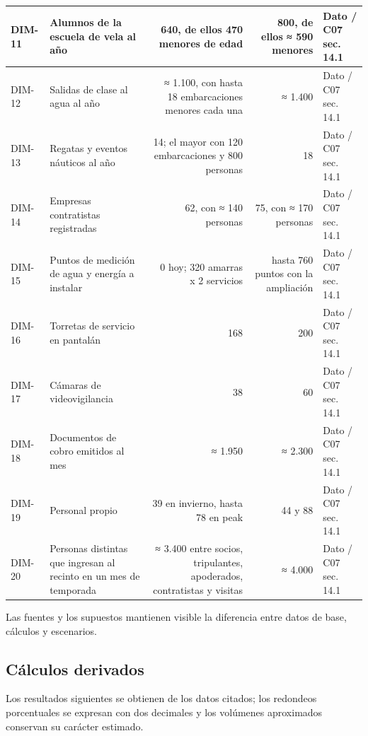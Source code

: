 \begin{longtable}{|L{0.075697\AnchoTablaAnexo}|L{0.254980\AnchoTablaAnexo}|R{0.294821\AnchoTablaAnexo}|R{0.266932\AnchoTablaAnexo}|L{0.107570\AnchoTablaAnexo}|}
DIM-11 & Alumnos de la escuela de vela al año & 640, de ellos 470 menores de edad & 800, de ellos ≈ 590 menores & Dato / C07 sec. 14.1 \\ \hline
DIM-12 & Salidas de clase al agua al año & ≈ 1.100, con hasta 18 embarcaciones menores cada una & ≈ 1.400 & Dato / C07 sec. 14.1 \\ \hline
{}
DIM-13 & Regatas y eventos náuticos al año & 14; el mayor con 120 embarcaciones y 800 personas & 18 & Dato / C07 sec. 14.1 \\ \hline
DIM-14 & Empresas contratistas registradas & 62, con ≈ 140 personas & 75, con ≈ 170 personas & Dato / C07 sec. 14.1 \\ \hline
{}
DIM-15 & Puntos de medición de agua y energía a instalar & 0 hoy; 320 amarras x 2 servicios & hasta 760 puntos con la ampliación & Dato / C07 sec. 14.1 \\ \hline
DIM-16 & Torretas de servicio en pantalán & 168 & 200 & Dato / C07 sec. 14.1 \\ \hline
{}
DIM-17 & Cámaras de videovigilancia & 38 & 60 & Dato / C07 sec. 14.1 \\ \hline
DIM-18 & Documentos de cobro emitidos al mes & ≈ 1.950 & ≈ 2.300 & Dato / C07 sec. 14.1 \\ \hline
{}
DIM-19 & Personal propio & 39 en invierno, hasta 78 en peak & 44 y 88 & Dato / C07 sec. 14.1 \\ \hline
DIM-20 & Personas distintas que ingresan al recinto en un mes de temporada & ≈ 3.400 entre socios, tripulantes, apoderados, contratistas y visitas & ≈ 4.000 & Dato / C07 sec. 14.1 \\ \hline
\end{longtable}

Las fuentes y los supuestos mantienen visible la diferencia entre datos de base, cálculos y escenarios.

\subsection*{Cálculos derivados}
Los resultados siguientes se obtienen de los datos citados; los redondeos porcentuales se expresan con dos decimales y los volúmenes aproximados conservan su carácter estimado.

